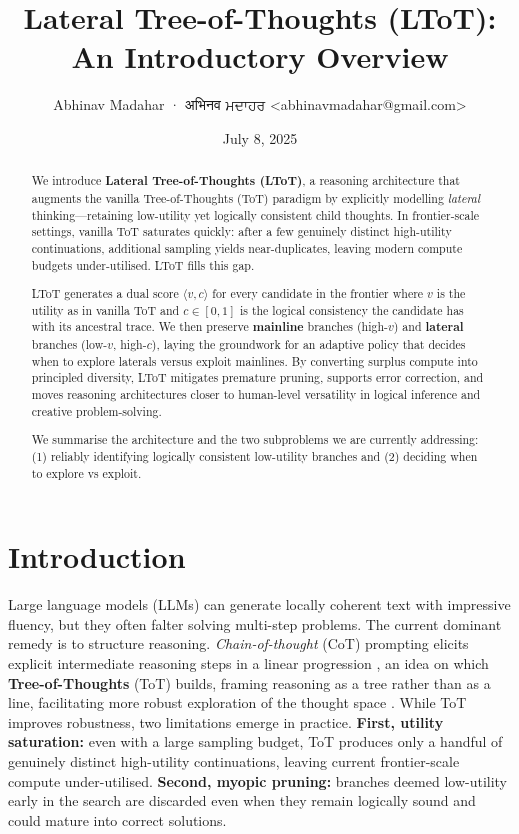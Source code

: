 \documentclass{IEEEtran}
\title{Lateral Tree-of-Thoughts (LToT): An Introductory Overview}
\author{Abhinav Madahar · {\devanagarifont अभिनव} {\gurmukhifont ਮਦਾਹਰ} <abhinavmadahar@gmail.com>}
\date{July 8, 2025}
\begin{document}
\maketitle

\begin{abstract}
   We introduce \textbf{Lateral Tree-of-Thoughts (LToT)}, a reasoning architecture that augments the vanilla Tree-of-Thoughts (ToT) paradigm by explicitly modelling \textit{lateral} thinking---retaining low-utility yet logically consistent child thoughts.
   In frontier-scale settings, vanilla ToT saturates quickly: after a few genuinely distinct high-utility continuations, additional sampling yields near-duplicates, leaving modern compute budgets under-utilised.
   LToT fills this gap.

   LToT generates a dual score $\langle v, c\rangle$ for every candidate in the frontier where $v$ is the utility as in vanilla ToT and $c \in [0, 1]$ is the logical consistency the candidate has with its ancestral trace.
   We then preserve \textbf{mainline} branches (high-$v$) and \textbf{lateral} branches (low-$v$, high-$c$), laying the groundwork for an adaptive policy that decides when to explore laterals versus exploit mainlines.
   By converting surplus compute into principled diversity, LToT mitigates premature pruning, supports error correction, and moves reasoning architectures closer to human-level versatility in logical inference and creative problem-solving.

   We summarise the architecture and the two subproblems we are currently addressing: (1) reliably identifying logically consistent low-utility branches and (2) deciding when to explore vs exploit.
\end{abstract}

\section{Introduction}
\label{section:introduction}
Large language models (LLMs) can generate locally coherent text with impressive fluency, but they often falter solving multi-step problems.
The current dominant remedy is to structure reasoning.
\textit{Chain-of-thought} (CoT) prompting elicits explicit intermediate reasoning steps in a linear progression \cite{wei2022cot}, an idea on which \textbf{Tree-of-Thoughts} (ToT) builds, framing reasoning as a tree rather than as a line, facilitating more robust exploration of the thought space \cite{yao2023tot}.
While ToT improves robustness, two limitations emerge in practice.
\textbf{First, utility saturation:} even with a large sampling budget, ToT produces only a handful of genuinely distinct high-utility continuations, leaving current frontier-scale compute under-utilised.
\textbf{Second, myopic pruning:} branches deemed low-utility early in the search are discarded even when they remain logically sound and could mature into correct solutions.
\end{document}
